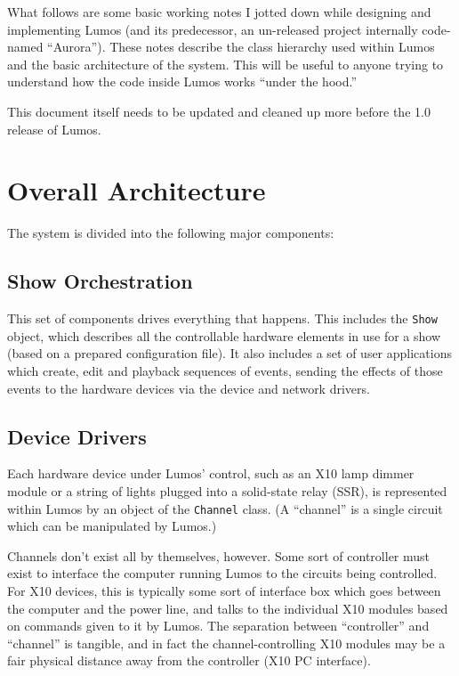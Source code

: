 \documentclass{article}
\begin{document}
What follows are some basic working notes I jotted down while designing and
implementing Lumos (and its predecessor, an un-released project internally
code-named ``Aurora'').  These notes describe the class hierarchy used within
Lumos and the basic architecture of the system.  This will be useful to anyone
trying to understand how the code inside Lumos works ``under the hood.''

This document itself needs to be updated and cleaned up more before the
1.0 release of Lumos.

\section{Overall Architecture}

The system is divided into the following major components:

\subsection{Show Orchestration}
This set of components drives everything that happens.  This includes
the {\tt Show} object, which describes all the controllable hardware 
elements in use for a show (based on a prepared configuration file).
It also includes a set of user applications which create, edit and playback
sequences of events, sending the effects of those events to the hardware
devices via the device and network drivers.

\subsection{Device Drivers}
Each hardware device under Lumos' control, such as an X10 lamp dimmer module
or a string of lights plugged into a solid-state relay (SSR), is represented 
within Lumos by an object of the {\tt Channel} class.  
(A ``channel'' is a single circuit which can be manipulated by Lumos.) 

Channels don't exist all by themselves, however.  Some sort of controller 
must exist to interface the computer running Lumos to the circuits being
controlled.  For X10 devices, this is typically some sort of interface box
which goes between the computer and the power line, and talks to the
individual X10 modules based on commands given to it by Lumos.  The separation
between ``controller'' and ``channel'' is tangible, and in fact the 
channel-controlling X10 modules may be a fair physical distance away from the
controller (X10 PC interface).
\end{document}
